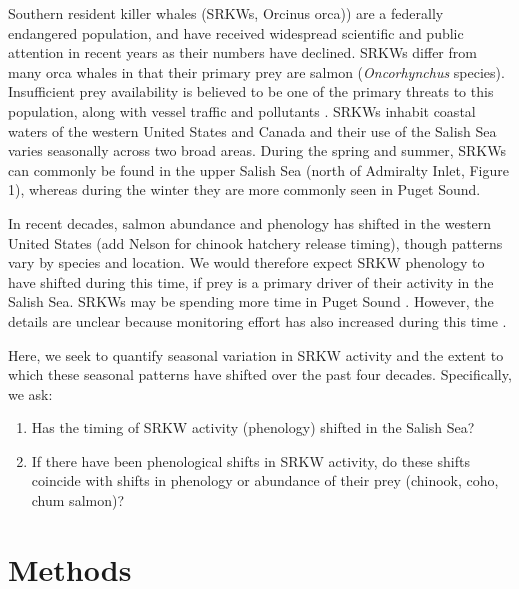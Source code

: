 \documentclass{article}
\begin{document}
\par Southern resident killer whales (SRKWs, Orcinus orca)) are a federally endangered population, and have received widespread scientific and public attention in recent years as their numbers have declined\citep[e.g., seattle times articles,][]{lusseau2009,larson2018, olson2018}. SRKWs differ from many orca whales in that their primary prey are salmon (\emph{Oncorhynchus} species).  Insufficient prey availability is believed to be one of the primary threats to this population, along with vessel traffic and pollutants \citep{krahn2007,lusseau2009,hanson2010}. SRKWs inhabit coastal waters of the western United States and Canada and their use of the Salish Sea varies seasonally across two broad areas. During the spring and summer, SRKWs can commonly be found in the upper Salish Sea (north of Admiralty Inlet, Figure 1), whereas during the winter they are more commonly seen in  Puget Sound.
\par In recent decades, salmon abundance and phenology has shifted in the western United States \citep{weinheimer2017,reed2011,ford2006,satterthwaite2014}(add Nelson for chinook hatchery release timing), though patterns vary by species and location. We would therefore expect SRKW phenology to have shifted during this time, if prey is a primary driver of their activity in the Salish Sea. SRKWs may be spending more time in Puget Sound \citep{olson2018}. However, the details are unclear because monitoring effort has also increased during this time \citep{olson2018, strebel2014}. 
\par Here, we seek to quantify seasonal variation in SRKW activity and the extent to which these seasonal patterns have shifted over the past four decades.  %
Specifically, we ask:
\begin{enumerate}
\item Has the timing of SRKW activity (phenology) shifted in the Salish Sea? 
\item If there have been phenological shifts in SRKW activity, do these shifts coincide with shifts in phenology or abundance of their prey (chinook, coho, chum salmon)?
\end{enumerate}

\section* {Methods}
\end{document}
